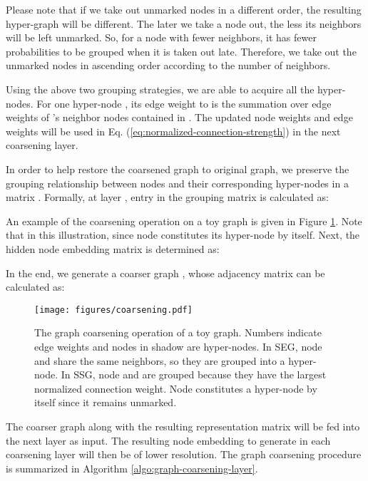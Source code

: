 \documentclass{article}
\begin{document}
Please note that if we take out unmarked nodes in a different order, the resulting hyper-graph will be different. The later we take a node out, the less its neighbors will be left unmarked. So, for a node with fewer neighbors, it has fewer probabilities to be grouped when it is taken out late. Therefore, we take out the unmarked nodes in ascending order according to the number of neighbors.

Using the above two grouping strategies, we are able to acquire all the hyper-nodes. For one hyper-node , its edge weight to  is the summation over edge weights of 's neighbor nodes contained in . The updated node weights and edge weights will be used in Eq. (\ref{eq:normalized-connection-strength}) in the next coarsening layer.

In order to help restore the coarsened graph to original graph, we preserve the grouping relationship between nodes and their corresponding hyper-nodes in a matrix . Formally, at layer , entry  in the grouping matrix  is calculated as:

An example of the coarsening operation on a toy graph is given in Figure \ref{fig:coarsening}. Note that  in this illustration, since node  constitutes its hyper-node by itself. Next, the hidden node embedding matrix is determined as:

In the end, we generate a coarser graph , whose adjacency matrix can be calculated as:


\begin{figure}
	\centering
	\texttt{[image: figures/coarsening.pdf]}
	\caption{The graph coarsening operation of a toy graph. Numbers indicate edge weights and nodes in shadow are hyper-nodes. In SEG, node  and  share the same neighbors, so they are grouped into a hyper-node. In SSG, node  and  are grouped because they have the largest normalized connection weight. Node  constitutes a hyper-node by itself since it remains unmarked.}
	\label{fig:coarsening}
\end{figure}

The coarser graph  along with the resulting representation matrix  will be fed into the next layer as input. The resulting node embedding to generate in each coarsening layer will then be of lower resolution. The graph coarsening procedure is summarized in Algorithm \ref{algo:graph-coarsening-layer}.
\end{document}
